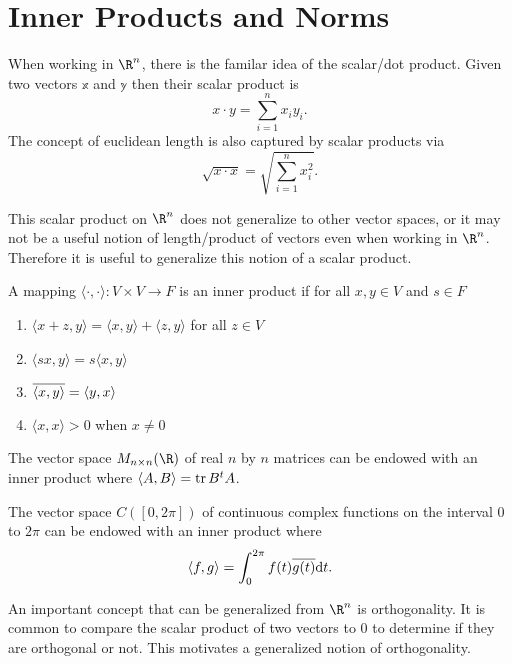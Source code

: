 \documentclass{subfiles}
\begin{document}
\chapter{Inner Products and Norms}

When working in $\R^n$, there is the familar idea of the scalar/dot product. Given two vectors $\mathbb{x}$ and $\mathbb{y}$ then their scalar product is
\[
    x \cdot y = \sum_{i=1}^n x_i y_i
.\]
The concept of euclidean length is also captured by scalar products via
\[
    \sqrt{x \cdot x} = \sqrt{\sum_{i=1}^n x_i^2}
.\]

This scalar product on $\R^n$ does not generalize to other vector spaces, or it may not be a useful notion of length/product of vectors even when working in $\R^n$. Therefore it is useful to generalize this notion of a scalar product.

\begin{definition}
    A mapping $\langle \cdot , \cdot \rangle : V \times V \to F$ is an inner product if for all $x,y \in V$ and $s \in F$
    \begin{enumerate}
        \item $\langle x + z, y \rangle = \langle x, y \rangle + \langle z, y \rangle$ for all $z \in V$
        \item $\langle sx, y \rangle = s \langle x, y \rangle$
        \item $\overline{ \langle x, y \rangle } = \langle y, x \rangle$
        \item $\langle x, x \rangle > 0$ when $x \neq 0$
    \end{enumerate}
\end{definition}

\begin{example}
    The vector space $M_{n\times n}(\R)$ of real $n$ by $n$ matrices can be endowed with an inner product where $\langle A, B \rangle = \trace{B^t A}$.
\end{example}

\begin{example}
    \label{ex:C_inner_product}
    The vector space $C([0, 2 \pi])$ of continuous complex functions on the interval $0$ to $2 \pi$ can be endowed with an inner product where 
    \[
        \langle f, g \rangle = \int_0^{2\pi} f(t) \overline{g(t)} \dd t
    .\]
\end{example}

An important concept that can be generalized from $\R^n$ is orthogonality. It is common to compare the scalar product of two vectors to $0$ to determine if they are orthogonal or not. This motivates a generalized notion of orthogonality.
\end{document}
